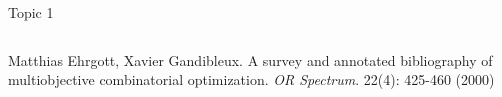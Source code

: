 \documentclass[10pt,xcolor=dvipsnames]{beamer}
\begin{document}
\begin{frame}{Topic 1}
\begin{columns}
\begin{column}{0.485\textwidth}
{{\tiny Matthias Ehrgott, Xavier Gandibleux.
A survey and annotated bibliography of multiobjective combinatorial optimization. \textit{OR Spectrum}. 22(4): 425-460 (2000)

}
\vspace{6mm}

}



\end{column}
\end{columns}
\end{frame}
\end{document}
